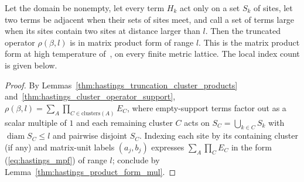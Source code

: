 \begin{lemma}
    \label{thm:hastings_truncated_product_form}
    \leanok
    Let the domain be
    nonempty, let every term $H_k$ act only on a set $S_k$ of
    sites, let two terms be adjacent when their sets of sites meet, and call a
    set of terms large when its sites contain two sites at distance larger
    than $l$. Then the truncated operator $\rho(\beta,l)$ is in matrix product
    form of range $l$. This is the matrix product form at high temperature
    of~\cite[lines 1256--1279]{Hastings2006Solving}, on every finite metric
    lattice. The local index count is given below.
\end{lemma}
\begin{proof}
    \leanok
    By Lemmas~\ref{thm:hastings_truncation_cluster_products}
    and~\ref{thm:hastings_cluster_operator_support},
    $\rho(\beta,l)=\sum_A\prod_{C\in\mathrm{clusters}(A)}E_C$, where empty-support
    terms factor out as a scalar multiple of $1$ and each remaining cluster $C$
    acts on $S_C=\bigcup_{k\in C}S_k$ with $\operatorname{diam}S_C\le l$ and
    pairwise disjoint $S_C$. Indexing each site by its containing cluster (if
    any) and matrix-unit labels $(a_j,b_j)$ expresses $\sum_A\prod_CE_C$ in the
    form (\ref{eq:hastings_mpf}) of range $l$; conclude by
    Lemma~\ref{thm:hastings_product_form_mul}.
\end{proof}

